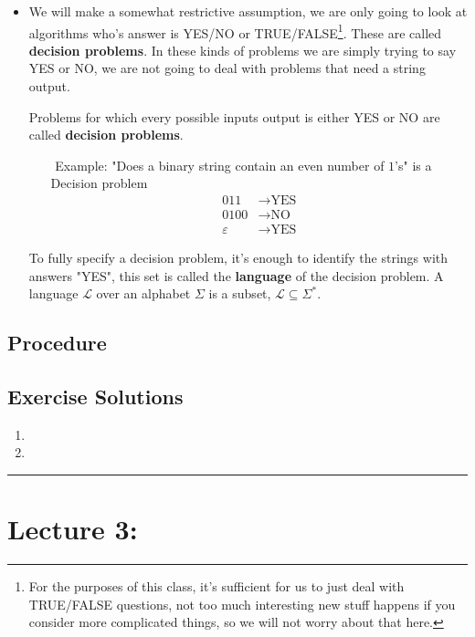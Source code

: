 \documentclass{article}
\begin{document}
\begin{itemize}
    \item We will make a somewhat restrictive assumption, we are only going to look at algorithms who's answer is YES/NO or TRUE/FALSE\footnote{For the purposes of this class, it's sufficient for us to just deal with TRUE/FALSE questions, not too much interesting new stuff happens if you consider more complicated things, so we will not worry about that here.}. These are called \textbf{decision problems}. In these kinds of problems we are simply trying to say YES or NO, we are not going to deal with problems that need a string output. 
    \begin{tcolorbox} [title= Definition:, colback=black!10!white]
        Problems for which every possible inputs output is either YES or NO are called \textbf{decision problems}.
    \end{tcolorbox}
    \begin{itemize}
        \item[$ $] Example: "Does a binary string contain an even number of $1$'s" is a Decision problem
        \begin{align*}
            011 &\rightarrow \text{YES}\\ 
            0100 &\rightarrow \text{NO}\\
            \varepsilon &\rightarrow \text{YES}
        \end{align*}  
    \end{itemize}
    \begin{tcolorbox} [title= Definition:, colback=black!10!white]
        To fully specify a decision problem, it's enough to identify the strings with answers "YES", this set is called the \textbf{language}\footnotemark{} of the decision problem. A language $\mathcal{L}$ over an alphabet $\Sigma$ is a subset, $\mathcal{L}\subseteq\Sigma^*$.
    \end{tcolorbox}\end{itemize}
\subsection*{Procedure}
\begin{figure}[H]
    \caption*{}
\end{figure}

\subsection*{Exercise Solutions}
\begin{enumerate}
    \item 
    \item 
\end{enumerate}

\begin{center}
	\rule{450pt}{1pt} 
\end{center}
\newpage

\section*{Lecture 3:}
\end{document}
